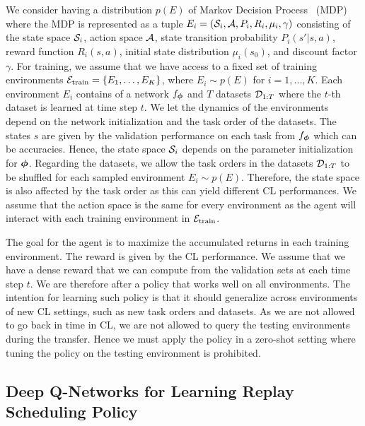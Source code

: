 We consider having a distribution $p(E)$ of Markov Decision Process~\cite{bellman1957markovian} (MDP) where the MDP is represented as a tuple $E_i = ({\mathcal{S}}_i, {\mathcal{A}}, P_i, R_i, \mu_i, \gamma)$ consisting of the state space ${\mathcal{S}}_i$, action space ${\mathcal{A}}$, state transition probability $P_i(s' | s, a)$, reward function $R_i(s, a)$, initial state distribution $\mu_i(s_0)$, and discount factor $\gamma$. For training, we assume that we have access to a fixed set of training environments ${\mathcal{E}}_{{\text{train}}} = \{E_1, \dots, E_K\}$, where $E_i \sim p(E)$ for $i=1, ..., K$. Each environment $E_i$ contains of a network $f_{{\bm{\phi}}}$ and $T$ datasets ${\mathcal{D}}_{1:T}$ where the $t$-th dataset is learned at time step $t$. We let the dynamics of the environments depend on the network initialization and the task order of the datasets. The states $s$ are given by the validation performance on each task from $f_{{\bm{\phi}}}$ which can be accuracies. Hence, the state space ${\mathcal{S}}_i$ depends on the parameter initialization for ${\bm{\phi}}$. Regarding the datasets, we allow the task orders in the datasets ${\mathcal{D}}_{1:T}$ to be shuffled for each sampled environment $E_i \sim p(E)$. Therefore, the state space is also affected by the task order as this can yield different CL performances. We assume that the action space is the same for every environment as the agent will interact with each training environment in ${\mathcal{E}}_{{\text{train}}}$. 

The goal for the agent is to maximize the accumulated returns in each training environment. The reward is given by the CL performance. We assume that we have a dense reward that we can compute from the validation sets at each time step $t$. We are therefore after a policy that works well on all environments. The intention for learning such policy is that it should generalize across environments of new CL settings, such as new task orders and datasets. As we are not allowed to go back in time in CL, we are not allowed to query the testing environments during the transfer. Hence we must apply the policy in a zero-shot setting where tuning the policy on the testing environment is prohibited.



\subsection{Deep Q-Networks for Learning Replay Scheduling Policy}

